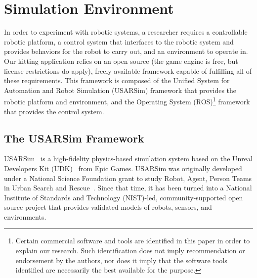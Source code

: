 \section{Simulation Environment}
\label{sect:simulation}

In order to experiment with robotic systems, a researcher requires a controllable robotic platform, a control system that interfaces to the robotic system and provides behaviors for the robot to carry out, and an environment to operate in. Our kitting application relies on an open source (the game engine is free, but license restrictions do apply), freely available framework capable of fulfilling all of these requirements. This framework is composed of the Unified System for Automation and Robot Simulation (USARSim) \cite{USARSimWeb} framework that provides the robotic platform and environment, and the Operating System (ROS)\footnote{Certain commercial software and tools are identified in this paper in order to explain our research. Such identification does not imply recommendation or endorsement by the authors, nor does it imply that the software tools identified are necessarily the best available for the purpose.}\cite{ROSWeb} framework that provides the control system.

\subsection{The USARSim Framework}

USARSim~\cite{CARPIN.LNAI.2006,WANG.WSC.2003} is a high-fidelity physics-based simulation system based on the Unreal Developers Kit (UDK)~\cite{UDKWeb} from Epic Games. USARSim was originally developed under a National Science Foundation grant to study Robot, Agent, Person Teams in Urban Search and Rescue~\cite{LEWIS.ICHC.2003}. Since that time, it has been turned into a National Institute of Standards and Technology (NIST)-led, community-supported open source project that provides validated models of robots, sensors, and environments.


